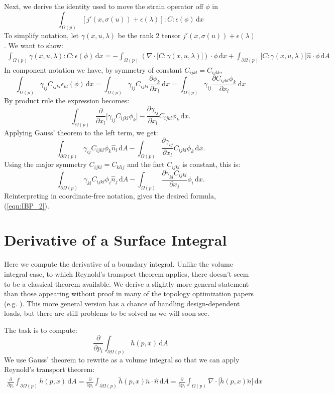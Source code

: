 \documentclass[10pt]{article}
\renewcommand{\div}{\nabla \cdot}
\providecommand{\shape}{\Omega(p)}
\providecommand{\boundary}{\partial \shape}
\providecommand{\vint}[1]{\int_{\shape} \! #1 \, \mathrm{d}x}
\providecommand{\sint}[1]{\int_{\boundary} \! #1 \, \mathrm{d}A}
\providecommand{\pder}[2]{\frac{\partial #1}{\partial #2}}
\begin{document}
\begin{appendices}
    Next, we derive the identity used to move the strain operator off $\phi$ in
    $$
    \vint{\left[j'(x, \sigma(u)) + \epsilon(\lambda)\right] : C : \epsilon(\phi)}
    $$
    To simplify notation, let $\gamma(x, u, \lambda)$ be the rank 2 tensor
    $j'(x, \sigma(u)) + \epsilon(\lambda)$. We want to show:
    \begin{align}
    \vint{\gamma(x, u, \lambda) : C : \epsilon(\phi)} =
    -\vint{\left(\div \big[C : \gamma(x, u, \lambda)\big]\right) \cdot \phi}
    + \sint{\big[C : \gamma(x, u, \lambda) \big] \hat{n} \cdot \phi}
    \label{eqn:IBP_2}
    \end{align}
    In component notation we have, by symmetry of constant $C_{ijkl} = C_{ijlk}$,
    $$
    \vint{\gamma_{ij} C_{ijkl} \epsilon_{kl}(\phi)} = \vint{\gamma_{ij} C_{ijkl} \pder{\phi_k}{x_l}} = \vint{\gamma_{ij} \pder{C_{ijkl} \phi_k}{x_l}}
    $$
    By product rule the expression becomes:
    $$
    \vint{\pder{}{x_l}\big[\gamma_{ij} C_{ijkl} \phi_k \big] - \pder{\gamma_{ij}}{x_l} C_{ijkl} \phi_k}.
    $$
    Applying Gauss' theorem to the left term, we get:
    $$
    \sint{\gamma_{ij} C_{ijkl} \phi_k \hat{n}_l} - \vint{\pder{\gamma_{ij}}{x_l} C_{ijkl} \phi_k}.
    $$
    Using the major symmetry $C_{ijkl} = C_{klij}$ and the fact $C_{ijkl}$ is constant, this is:
    $$
    \sint{\gamma_{kl} C_{ijkl} \phi_i \hat{n}_j} - \vint{\pder{\gamma_{kl}C_{ijkl} }{x_j} \phi_i}.
    $$
    Reinterpreting in coordinate-free notation, gives the desired formula, (\ref{eqn:IBP_2}).
    \section{Derivative of a Surface Integral}
    \label{sec:der_sint}
    Here we compute the derivative of a boundary integral. Unlike the volume
    integral case, to which Reynold's transport theorem applies, there doesn't
    seem to be a classical theorem available. We derive a slightly more general
    statement than those appearing without proof in many of the topology
    optimization papers (e.g. \cite{Allaire2008909}). This more general version
    has a chance of handling design-dependent loads, but there are still
    problems to be solved as we will soon see.

    The task is to compute:
    $$
    \pder{}{p_i} \sint{h(p, x)}
    $$
    We use Gauss' theorem to rewrite as a volume integral so that we can apply
    Reynold's transport theorem:
    \begin{align*}
        \pder{}{p_i} \sint{h(p, x)} = \pder{}{p_i} \sint{\tilde{h}(p, x)\tilde{n} \cdot \hat{n}}
    = \pder{}{p_i} \vint{\div \big[\tilde{h}(p, x)\tilde{n} \big]}
    \end{align*}


\end{appendices}
\end{document}
